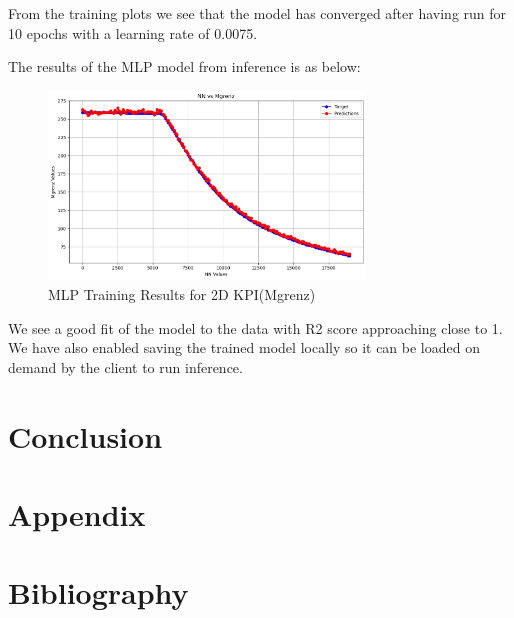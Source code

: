 \documentclass{report} %
\begin{document}
From the training plots we see that the model has converged after having run for 10 epochs with a learning rate of 0.0075.

The results of the MLP model from inference is as below:

\begin{figure}[h]
    \centering
    \includegraphics[width=0.75\textwidth]{./ReportImages/mlp_kpi2d_prediction.png} 
    \caption{MLP Training Results for 2D KPI(Mgrenz)} 
    \label{fig:MLP Training Results for 2D KPI(Mgrenz)}
\end{figure}

We see a good fit of the model to the data with R2 score approaching close to 1.
We have also enabled saving the trained model locally so it can be loaded on demand by the client to run inference.
\newpage 

\chapter*{Conclusion}

\newpage 

\newpage 

\listoffigures

\newpage 

\newpage 

\listoftables

\newpage 

\newpage 

\chapter*{Appendix}

\newpage 

\newpage 

\chapter*{Bibliography}
\newpage 
\end{document}

